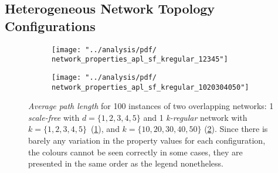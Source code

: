 \subsection{Heterogeneous Network Topology Configurations}
\begin{figure}[H]
\centering
\begin{subfigure}{.49\linewidth}
  \centering
 \texttt{[image: "../analysis/pdf/ network\_properties\_apl\_sf\_kregular\_12345"]}
 \caption{}
 \label{append_fig:network_properties_apl_sf_kreg_12345}
\end{subfigure}%
\begin{subfigure}{.49\linewidth}
  \centering
 \texttt{[image: "../analysis/pdf/ network\_properties\_apl\_sf\_kregular\_1020304050"]}
 \caption{}
 \label{append_fig:network_properties_apl_sf_kreg_1020304050}
\end{subfigure}

\begin{minipage}{0.9\linewidth}
\vspace{0.2cm}
\caption{\textit{Average path length} for 100 instances of two overlapping networks: 1 \textit{scale-free} with $d=\{1,2,3,4,5\}$ and 1 \textit{k-regular} network with ~$k=\{1,2,3,4,5\}$~(\ref{append_fig:network_properties_apl_sf_kreg_12345}), and  $k=\{10,20,30,40,50\}$ (\ref{append_fig:network_properties_apl_sf_kreg_1020304050}). Since there is barely any variation in the property values for each configuration, the colours cannot be seen correctly in some cases, they are presented in the same order as the legend nonetheless.}
\label{append_fig:network_properties_apl_sf_kreg}
\end{minipage}

\end{figure}

